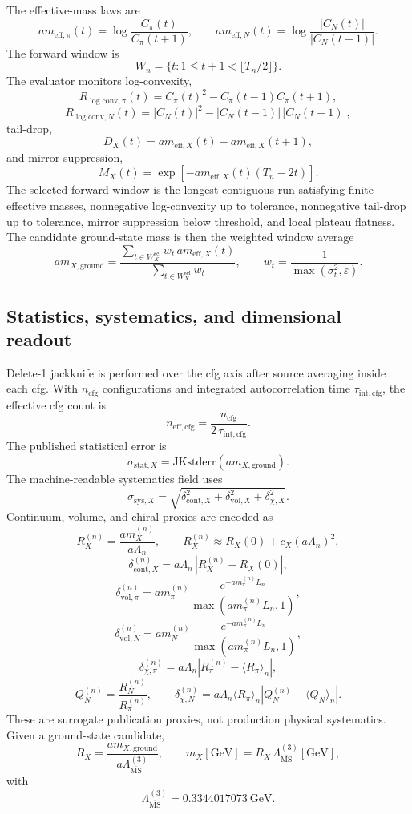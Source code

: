 \documentclass[11pt]{article}
\begin{document}
The effective-mass laws are
\[
a m_{\mathrm{eff},\pi}(t)
=
\log\!\frac{C_\pi(t)}{C_\pi(t+1)},
\qquad
a m_{\mathrm{eff},N}(t)
=
\log\!\frac{|C_N(t)|}{|C_N(t+1)|}.
\]
The forward window is
\[
W_n = \{ t : 1 \le t+1 < \lfloor T_n/2 \rfloor \}.
\]
The evaluator monitors log-convexity,
\[
R_{\log\mathrm{conv},\pi}(t)
=
C_\pi(t)^2 - C_\pi(t-1)C_\pi(t+1),
\]
\[
R_{\log\mathrm{conv},N}(t)
=
|C_N(t)|^2 - |C_N(t-1)|\,|C_N(t+1)|,
\]
tail-drop,
\[
D_X(t)
=
a m_{\mathrm{eff},X}(t) - a m_{\mathrm{eff},X}(t+1),
\]
and mirror suppression,
\[
M_X(t)
=
\exp[-a m_{\mathrm{eff},X}(t)(T_n - 2t)].
\]
The selected forward window is the longest contiguous run satisfying finite effective masses,
nonnegative log-convexity up to tolerance, nonnegative tail-drop up to tolerance, mirror
suppression below threshold, and local plateau flatness. The candidate ground-state mass is then
the weighted window average
\[
a m_{X,\mathrm{ground}}
=
\frac{\sum_{t\in W_X^{\mathrm{sel}}} w_t\,a m_{\mathrm{eff},X}(t)}
{\sum_{t\in W_X^{\mathrm{sel}}} w_t},
\qquad
w_t = \frac{1}{\max(\sigma_t^2,\varepsilon)}.
\]

\subsection{Statistics, systematics, and dimensional readout}

Delete-1 jackknife is performed over the cfg axis after source averaging inside each cfg. With
\(n_{\mathrm{cfg}}\) configurations and integrated autocorrelation time
\(\tau_{\mathrm{int},\mathrm{cfg}}\), the effective cfg count is
\[
n_{\mathrm{eff},\mathrm{cfg}}
=
\frac{n_{\mathrm{cfg}}}{2\,\tau_{\mathrm{int},\mathrm{cfg}}}.
\]
The published statistical error is
\[
\sigma_{\mathrm{stat},X}
=
\mathrm{JKstderr}(a m_{X,\mathrm{ground}}).
\]
The machine-readable systematics field uses
\[
\sigma_{\mathrm{sys},X}
=
\sqrt{
\delta_{\mathrm{cont},X}^2
+
\delta_{\mathrm{vol},X}^2
+
\delta_{\chi,X}^2
}.
\]
Continuum, volume, and chiral proxies are encoded as
\[
R_X^{(n)} = \frac{a m_X^{(n)}}{a\Lambda_n},
\qquad
R_X^{(n)} \approx R_X(0) + c_X (a\Lambda_n)^2,
\]
\[
\delta_{\mathrm{cont},X}^{(n)}
=
a\Lambda_n\,\left|R_X^{(n)} - R_X(0)\right|,
\]
\[
\delta_{\mathrm{vol},\pi}^{(n)}
=
a m_\pi^{(n)}
\frac{e^{-a m_\pi^{(n)}L_n}}{\max(a m_\pi^{(n)}L_n,1)},
\]
\[
\delta_{\mathrm{vol},N}^{(n)}
=
a m_N^{(n)}
\frac{e^{-a m_\pi^{(n)}L_n}}{\max(a m_\pi^{(n)}L_n,1)},
\]
\[
\delta_{\chi,\pi}^{(n)}
=
a\Lambda_n \left|R_\pi^{(n)} - \langle R_\pi\rangle_n\right|,
\]
\[
Q_N^{(n)} = \frac{R_N^{(n)}}{R_\pi^{(n)}},
\qquad
\delta_{\chi,N}^{(n)}
=
a\Lambda_n \langle R_\pi\rangle_n
\left|Q_N^{(n)} - \langle Q_N\rangle_n\right|.
\]
These are surrogate publication proxies, not production physical systematics. Given a
ground-state candidate,
\[
R_X = \frac{a m_{X,\mathrm{ground}}}{a\Lambda_{\overline{\mathrm{MS}}}^{(3)}},
\qquad
m_X[\mathrm{GeV}] = R_X\,\Lambda_{\overline{\mathrm{MS}}}^{(3)}[\mathrm{GeV}],
\]
with
\[
\Lambda_{\overline{\mathrm{MS}}}^{(3)} = 0.3344017073\ \mathrm{GeV}.
\]
\end{document}
